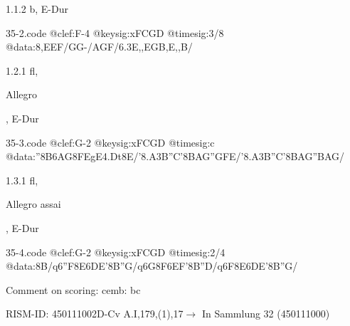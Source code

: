 \documentclass[a4paper, twocolumn, 11pt]{book}
\begin{document}
\newline %
\par 1.1.2  b, E-Dur  
\begin{filecontents*}{35-2.code}
@clef:F-4
@keysig:xFCGD
@timesig:3/8
@data:8,{EEF}/{GG}-/{AGF}/{6.3E,,EGB,E,,B}/
\end{filecontents*}

\newline %
\par 1.2.1  fl, \begin{itshape}Allegro\end{itshape}, E-Dur  
\begin{filecontents*}{35-3.code}
@clef:G-2
@keysig:xFCGD
@timesig:c
@data:''{8B6AG}8{FE}gE4.Dt8E/'{8.A3B''C}'{8BA}{G''GFE}/'{8.A3B''C}'{8BA}{G''BAG}/
\end{filecontents*}

\newline %
\par 1.3.1  fl, \begin{itshape}Allegro assai\end{itshape}, E-Dur  
\begin{filecontents*}{35-4.code}
@clef:G-2
@keysig:xFCGD
@timesig:2/4
@data:8B/q6''F{8E6DE}{'8B''G}/q6G8{F6EF}'8{B''D}/q6F{8E6DE}'8{B''G}/
\end{filecontents*}

\newline %
\par Comment on scoring: cemb: bc
\par RISM-ID: 450111002\newline D-Cv  A.I,179,(1),17\newline $\rightarrow$ In Sammlung 32 (450111000)
      
\end{document}

